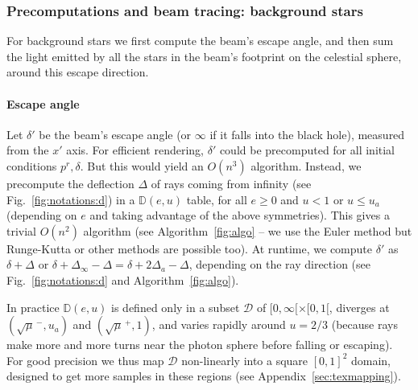 \documentclass{document}
\begin{document}
\subsubsection{Precomputations and beam tracing: background stars}

For background stars we first compute the beam's escape angle, and then sum the 
light emitted by all the stars in the beam's footprint on the celestial sphere, 
around this escape direction.

\paragraph*{Escape angle} Let $\delta'$ be the beam's escape angle (or $\infty$ 
if it falls into the black hole), measured from the $x'$ axis. For efficient 
rendering, $\delta'$ could be precomputed for all initial conditions $p^r, 
\delta$. But this would yield an $O(n^3)$ algorithm. Instead, we precompute the 
deflection $\Delta$ of rays coming from infinity (see 
Fig.~\ref{fig:notations:d}) in a $\mathbb{D}(e, u)$ table, for all $e \ge 0$ 
and $u < 1$ or $u \le u_a$ (depending on $e$ and taking advantage of the above 
symmetries). This gives a trivial $O(n^2)$ algorithm (see 
Algorithm~\ref{fig:algo} -- we use the Euler method but Runge-Kutta or other 
methods are possible too). At runtime, we compute $\delta'$ as $\delta + 
\Delta$ or $\delta + \Delta_{\infty} - \Delta = \delta + 2\Delta_a - \Delta$, 
depending on the ray direction (see Fig.~\ref{fig:notations:d} and 
Algorithm~\ref{fig:algo}).

In practice $\mathbb{D}(e, u)$ is defined only in a subset $\mathcal{D}$ of 
$[0, \infty[ \times [0, 1[$, diverges at $(\sqrt{\mu}^{\,-},u_a)$ and 
$(\sqrt{\mu}^{\,+},1)$, and varies rapidly around $u = 2 / 3$ (because rays 
make more and more turns near the photon sphere before falling or escaping). 
For good precision we thus map $\mathcal{D}$ non-linearly into a square $[0, 
1]^2$ domain, designed to get more samples in these regions (see 
Appendix~\ref{sec:texmapping}).
\end{document}

